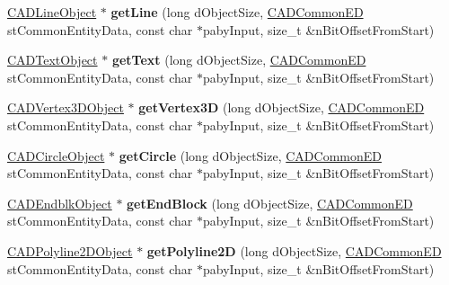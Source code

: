 \begin{DoxyCompactItemize}
\item 
\hyperlink{class_c_a_d_line_object}{C\+A\+D\+Line\+Object} $\ast$ {\bfseries get\+Line} (long d\+Object\+Size, \hyperlink{struct_c_a_d_common_e_d}{C\+A\+D\+Common\+ED} st\+Common\+Entity\+Data, const char $\ast$paby\+Input, size\+\_\+t \&n\+Bit\+Offset\+From\+Start)\hypertarget{class_d_w_g_file_r2000_a0378b7bc2aa0949d4a39c25d4957b19a}{}\label{class_d_w_g_file_r2000_a0378b7bc2aa0949d4a39c25d4957b19a}

\item 
\hyperlink{class_c_a_d_text_object}{C\+A\+D\+Text\+Object} $\ast$ {\bfseries get\+Text} (long d\+Object\+Size, \hyperlink{struct_c_a_d_common_e_d}{C\+A\+D\+Common\+ED} st\+Common\+Entity\+Data, const char $\ast$paby\+Input, size\+\_\+t \&n\+Bit\+Offset\+From\+Start)\hypertarget{class_d_w_g_file_r2000_aee97ae28227cf3b863ea8b7eeb2b9667}{}\label{class_d_w_g_file_r2000_aee97ae28227cf3b863ea8b7eeb2b9667}

\item 
\hyperlink{class_c_a_d_vertex3_d_object}{C\+A\+D\+Vertex3\+D\+Object} $\ast$ {\bfseries get\+Vertex3D} (long d\+Object\+Size, \hyperlink{struct_c_a_d_common_e_d}{C\+A\+D\+Common\+ED} st\+Common\+Entity\+Data, const char $\ast$paby\+Input, size\+\_\+t \&n\+Bit\+Offset\+From\+Start)\hypertarget{class_d_w_g_file_r2000_ad78933ce9d2bde76f7942c6834845f7f}{}\label{class_d_w_g_file_r2000_ad78933ce9d2bde76f7942c6834845f7f}

\item 
\hyperlink{class_c_a_d_circle_object}{C\+A\+D\+Circle\+Object} $\ast$ {\bfseries get\+Circle} (long d\+Object\+Size, \hyperlink{struct_c_a_d_common_e_d}{C\+A\+D\+Common\+ED} st\+Common\+Entity\+Data, const char $\ast$paby\+Input, size\+\_\+t \&n\+Bit\+Offset\+From\+Start)\hypertarget{class_d_w_g_file_r2000_a38c1db17937fc9504f227250819a17e9}{}\label{class_d_w_g_file_r2000_a38c1db17937fc9504f227250819a17e9}

\item 
\hyperlink{class_c_a_d_endblk_object}{C\+A\+D\+Endblk\+Object} $\ast$ {\bfseries get\+End\+Block} (long d\+Object\+Size, \hyperlink{struct_c_a_d_common_e_d}{C\+A\+D\+Common\+ED} st\+Common\+Entity\+Data, const char $\ast$paby\+Input, size\+\_\+t \&n\+Bit\+Offset\+From\+Start)\hypertarget{class_d_w_g_file_r2000_ac294ef7c9cd622dcc2ad4eeddb5ad017}{}\label{class_d_w_g_file_r2000_ac294ef7c9cd622dcc2ad4eeddb5ad017}

\item 
\hyperlink{class_c_a_d_polyline2_d_object}{C\+A\+D\+Polyline2\+D\+Object} $\ast$ {\bfseries get\+Polyline2D} (long d\+Object\+Size, \hyperlink{struct_c_a_d_common_e_d}{C\+A\+D\+Common\+ED} st\+Common\+Entity\+Data, const char $\ast$paby\+Input, size\+\_\+t \&n\+Bit\+Offset\+From\+Start)\hypertarget{class_d_w_g_file_r2000_aaba322e7a18c5cc39925567cf9679b0b}{}\label{class_d_w_g_file_r2000_aaba322e7a18c5cc39925567cf9679b0b}


\end{DoxyCompactItemize}
